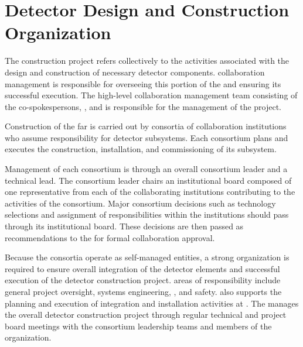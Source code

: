 \section{Detector Design and Construction Organization}   %
\label{sec:es-tc-det-const}

The   construction project refers collectively 
to the activities associated with the design and construction of 
necessary detector components.   collaboration management 
is responsible for overseeing this portion of the  and 
ensuring its successful execution.  The high-level  
collaboration management team consisting of the co-spokespersons, 
, and  is responsible for the
management of the project.  

Construction of the  far  is carried out by 
consortia of collaboration institutions who assume responsibility 
for detector subsystems.  Each consortium plans and executes the 
construction, installation, and commissioning of its subsystem.

Management of each consortium is through an overall consortium leader 
and a technical lead.  The consortium leader chairs an institutional 
board composed of one representative from each of the collaborating 
institutions contributing to the activities of the consortium.  Major 
consortium decisions such as technology selections and assignment of 
responsibilities within the institutions should pass  
through its institutional board.  These decisions are then passed 
as recommendations to the   for formal collaboration approval.

Because the consortia operate as self-managed entities, a strong
 organization is required to ensure overall integration 
of the detector elements and successful execution of the detector
construction project.   areas of responsibility include 
general project oversight, systems engineering, , and 
safety.   also supports the planning and execution 
of integration and installation activities at .
The  manages the overall detector construction 
project through regular technical and project board meetings with 
the consortium leadership teams and members of the  
organization.

